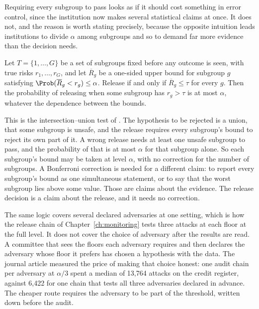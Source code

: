 Requiring every subgroup to pass looks as if it should cost something in error
control, since the institution now makes several statistical claims at once. It does
not, and the reason is worth stating precisely, because the opposite intuition
leads institutions to divide $\alpha$ among subgroups and so to demand far more
evidence than the decision needs.

\begin{proposition}\label{c07:prop-iut}
Let $T = \{1,\dots,G\}$ be a set of subgroups fixed before any outcome is seen, with
true risks $r_1,\dots,r_G$, and let $\overline{R}_g$ be a one-sided upper bound for
subgroup $g$ satisfying $\Prob(\overline{R}_g < r_g) \le \alpha$. Release if and only
if $\overline{R}_g \le \tau$ for every $g$. Then the probability of releasing when
some subgroup has $r_g > \tau$ is at most $\alpha$, whatever the dependence between
the bounds.
\end{proposition}

This is the intersection--union test of \citet{berger1982}. The hypothesis to be
rejected is a union, that some subgroup is unsafe, and the release requires every
subgroup's bound to reject its own part of it. A wrong release needs at least one
unsafe subgroup to pass, and the probability of that is at most $\alpha$ for that
subgroup alone. So each subgroup's bound may be taken at level $\alpha$, with no
correction for the number of subgroups. A Bonferroni correction is needed for a
different claim: to report every subgroup's bound as one simultaneous statement, or
to say that the worst subgroup lies above some value. Those are claims about the
evidence. The release decision is a claim about the release, and it needs no
correction.

The same logic covers several declared adversaries at one setting, which is how the
release chain of Chapter~\ref{ch:monitoring} tests three attacks at each floor at
the full level. It does not cover the choice of adversary after the results are
read. A committee that sees the floors each adversary requires and then declares
the adversary whose floor it prefers has chosen a hypothesis with the data. The
journal article measured the price of making that choice honest: one audit chain per
adversary at $\alpha/3$ spent a median of 13,764 attacks on the credit register,
against 6,422 for one chain that tests all three adversaries declared in advance.
The cheaper route requires the adversary to be part of the threshold, written down
before the audit.

